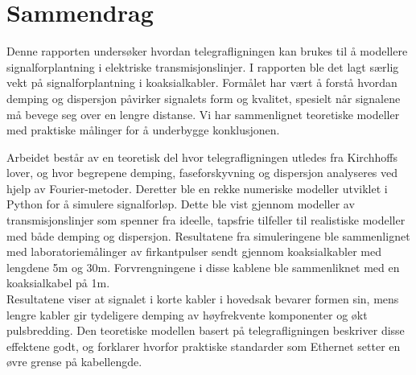 \section*{Sammendrag}
Denne rapporten undersøker hvordan telegrafligningen kan brukes til å modellere signalforplantning i elektriske transmisjonslinjer. I rapporten ble det lagt særlig vekt på signalforplantning i koaksialkabler. Formålet har vært å forstå hvordan demping og dispersjon påvirker signalets form og kvalitet, spesielt når signalene må bevege seg over en lengre distanse. Vi har sammenlignet teoretiske modeller med praktiske målinger for å underbygge konklusjonen. 

Arbeidet består av en teoretisk del hvor telegrafligningen utledes fra Kirchhoffs lover, og hvor begrepene demping, faseforskyvning og dispersjon analyseres ved hjelp av Fourier-metoder. Deretter ble en rekke numeriske modeller utviklet i Python for å simulere signalforløp. Dette ble vist gjennom modeller av transmisjonslinjer som spenner fra ideelle, tapsfrie tilfeller til realistiske modeller med både demping og dispersjon. Resultatene fra simuleringene ble sammenlignet med laboratoriemålinger av firkantpulser sendt gjennom koaksialkabler med lengdene 5m og 30m. Forvrengningene i disse kablene ble sammenliknet med en koaksialkabel på 1m.
\\[1em]
Resultatene viser at signalet i korte kabler i hovedsak bevarer formen sin, mens lengre kabler gir tydeligere demping av høyfrekvente komponenter og økt pulsbredding. Den teoretiske modellen basert på telegrafligningen beskriver disse effektene godt, og forklarer hvorfor praktiske standarder som Ethernet setter en øvre grense på kabellengde.

